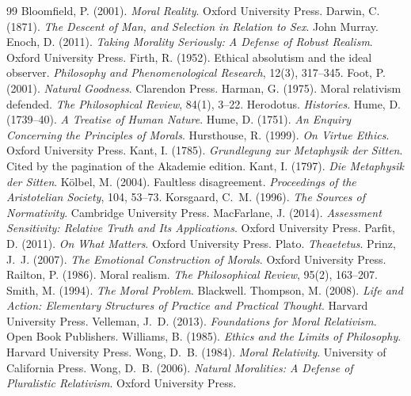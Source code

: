 \documentclass{situationist-preprint}
\begin{document}
\begin{thebibliography}{99}\small
{} Bloomfield, P. (2001). \emph{Moral Reality}. Oxford University Press.
 Darwin, C. (1871). \emph{The Descent of Man, and Selection in Relation to Sex}. John Murray.
 Enoch, D. (2011). \emph{Taking Morality Seriously: A Defense of Robust Realism}. Oxford University Press.
 Firth, R. (1952). Ethical absolutism and the ideal observer. \emph{Philosophy and Phenomenological Research}, 12(3), 317--345.
 Foot, P. (2001). \emph{Natural Goodness}. Clarendon Press.
 Harman, G. (1975). Moral relativism defended. \emph{The Philosophical Review}, 84(1), 3--22.
 Herodotus. \emph{Histories}.
 Hume, D. (1739--40). \emph{A Treatise of Human Nature}.
 Hume, D. (1751). \emph{An Enquiry Concerning the Principles of Morals}.
 Hursthouse, R. (1999). \emph{On Virtue Ethics}. Oxford University Press.
 Kant, I. (1785). \emph{Grundlegung zur Metaphysik der Sitten}. Cited by the pagination of the Akademie edition.
 Kant, I. (1797). \emph{Die Metaphysik der Sitten}.
 K\"olbel, M. (2004). Faultless disagreement. \emph{Proceedings of the Aristotelian Society}, 104, 53--73.
 Korsgaard, C.~M. (1996). \emph{The Sources of Normativity}. Cambridge University Press.
 MacFarlane, J. (2014). \emph{Assessment Sensitivity: Relative Truth and Its Applications}. Oxford University Press.
 Parfit, D. (2011). \emph{On What Matters}. Oxford University Press.
 Plato. \emph{Theaetetus}.
 Prinz, J.~J. (2007). \emph{The Emotional Construction of Morals}. Oxford University Press.
 Railton, P. (1986). Moral realism. \emph{The Philosophical Review}, 95(2), 163--207.
 Smith, M. (1994). \emph{The Moral Problem}. Blackwell.
 Thompson, M. (2008). \emph{Life and Action: Elementary Structures of Practice and Practical Thought}. Harvard University Press.
 Velleman, J.~D. (2013). \emph{Foundations for Moral Relativism}. Open Book Publishers.
 Williams, B. (1985). \emph{Ethics and the Limits of Philosophy}. Harvard University Press.
 Wong, D.~B. (1984). \emph{Moral Relativity}. University of California Press.
 Wong, D.~B. (2006). \emph{Natural Moralities: A Defense of Pluralistic Relativism}. Oxford University Press.
\end{thebibliography}
\end{document}

